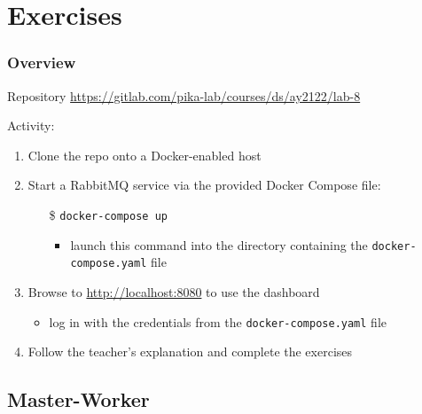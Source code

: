 \documentclass{beamer}\mode<presentation>{\usetheme{AMSBolognaFC}}
\newcommand{\labN}{8}
\newcommand{\labGroup}{https://gitlab.com/pika-lab/courses/ds/ay2122}
\newcommand{\labRepo}{\labGroup/lab-\labN}
\begin{document}
\section{Exercises}

\begin{frame}
	\frametitle{Overview}

	\begin{block}{Repository}\centering
		\url{\labRepo}
	\end{block}

	\vfill

	Activity:
	\vfill
	\begin{enumerate}
		\item Clone the repo onto a \alert{Docker-enabled} host

		\vfill

		\item Start a RabbitMQ service via the provided Docker Compose file:
        \begin{itemize}
            \item[\$] \texttt{docker-compose up}
            \begin{itemize}
                \item launch this command into the directory containing the \texttt{docker-compose.yaml} file
            \end{itemize}
        \end{itemize}

        \vfill

        \item Browse to \url{http://localhost:8080} to use the dashboard
        \begin{itemize}
            \item log in with the credentials from the \texttt{docker-compose.yaml} file
        \end{itemize}

        \vfill

        \item Follow the teacher's explanation and complete the exercises

	\end{enumerate}

\end{frame}

\subsection{Master-Worker}
\end{document}
